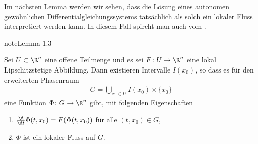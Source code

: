 \documentclass[letterpaper,10pt,english]{jupyterBook}
\begin{document}
\sphinxAtStartPar
Im nächsten Lemma werden wir sehen, dass die Lösung eines autonomen gewöhnlichen Differentialgleichungssystems tatsächlich als solch ein lokaler Fluss interpretiert werden kann.
In diesem Fall spircht man auch vom .
\label{ode/fluesse:lemma-3}
\begin{sphinxadmonition}{note}{Lemma 1.3}



\sphinxAtStartPar
Sei \(U\subset\R^n\) eine offene Teilmenge und es sei \(F \colon U \rightarrow \R^n\) eine lokal Lipschitzstetige Abbildung.
Dann existieren Intervalle \(I(x_0)\), so dass es für den erweiterten Phasenraum
\begin{equation*}
\begin{split}G = \bigcup_{x_0\in U} I(x_0)\times\{x_0\}\end{split}
\end{equation*}
\sphinxAtStartPar
eine Funktion \(\Phi \colon G\rightarrow \R^n\) gibt, mit folgenden Eigenschaften
\begin{enumerate}
%
\item {} 
\sphinxAtStartPar
\(\frac{\d}{\d t} \Phi(t, x_0) = F(\Phi(t, x_0))\) für alle \((t,x_0)\in G\),

\item {} 
\sphinxAtStartPar
\(\Phi\) ist ein lokaler Fluss auf \(G\).

\end{enumerate}
\end{sphinxadmonition}
\end{document}
